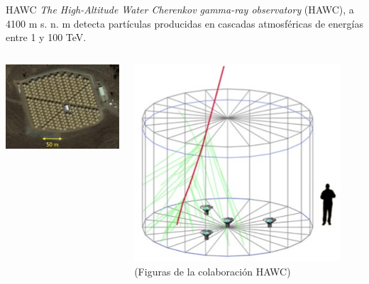 \documentclass[10pt,xcolor=table]{beamer}
\begin{document}
\begin{frame}{HAWC}
\textit{The High-Altitude Water Cherenkov gamma-ray observatory} (HAWC), a 4100 m s. n. m detecta part\'iculas producidas en cascadas atmosf\'ericas de energ\'ias entre 1 y 100 TeV. \vspace{0.3cm}
	\begin{columns}
		\begin{column}{0.7\textwidth}
		\center
		\href{run:Figuras/HAWC.mov?autostart&loop&start=2&stop=120}
       {\includegraphics[width=1\textwidth]{Figuras/hawc-array}}
		\end{column}
		
		\begin{column}{0.3\textwidth}
		\center
		\includegraphics[width=0.9\textwidth]{Figuras/hawc-tank}
		(Figuras de la colaboraci\'on HAWC)
		\end{column}
	\end{columns}

\end{frame}
	
\end{document}
